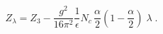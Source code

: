 \begin{equation}
  \label{Zxi}
  Z_\lambda  = Z_3 - \frac{g^2}{16\pi^2}  \frac{1}{\epsilon} N_c \,
              \frac \alpha 2 (1-\frac \alpha 2 ) \; \lambda    \; .
\end{equation}

